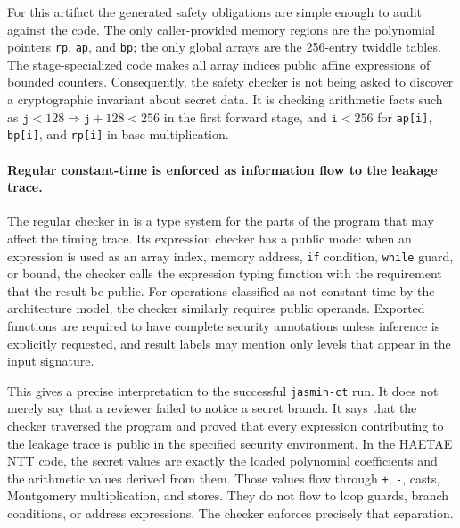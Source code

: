 \documentclass[10pt,twocolumn]{article}
\newcommand{\haetae}{HAETAE}
\newcommand{\ct}{constant-time}
\begin{document}
For this artifact the generated safety obligations are simple enough to audit
against the code.  The only caller-provided memory regions are the polynomial
pointers \texttt{rp}, \texttt{ap}, and \texttt{bp}; the only global arrays are
the 256-entry twiddle tables.  The stage-specialized code makes all array
indices public affine expressions of bounded counters.  Consequently, the
safety checker is not being asked to discover a cryptographic invariant about
secret data.  It is checking arithmetic facts such as
\(\texttt{j}<128 \Rightarrow \texttt{j}+128<256\) in the first forward stage,
and \(\texttt{i}<256\) for \texttt{ap[i]}, \texttt{bp[i]}, and \texttt{rp[i]} in
base multiplication.

\paragraph{Regular \ct{} is enforced as information flow to the leakage trace.}
The regular checker in  is a type system for the
parts of the program that may affect the timing trace.  Its expression checker
has a public mode: when an expression is used as an array index, memory address,
\texttt{if} condition, \texttt{while} guard, or bound, the checker calls the
expression typing function with the requirement that the result be public.  For
operations classified as not constant time by the architecture model, the
checker similarly requires public operands.  Exported functions are required to
have complete security annotations unless inference is explicitly requested,
and result labels may mention only levels that appear in the input signature.

This gives a precise interpretation to the successful \texttt{jasmin-ct} run.
It does not merely say that a reviewer failed to notice a secret branch.  It
says that the checker traversed the program and proved that every expression
contributing to the leakage trace is public in the specified security
environment.  In the \haetae{} NTT code, the secret values are exactly the
loaded polynomial coefficients and the arithmetic values derived from them.
Those values flow through \texttt{+}, \texttt{-}, casts, Montgomery
multiplication, and stores.  They do not flow to loop guards, branch
conditions, or address expressions.  The checker enforces precisely that
separation.
\end{document}
